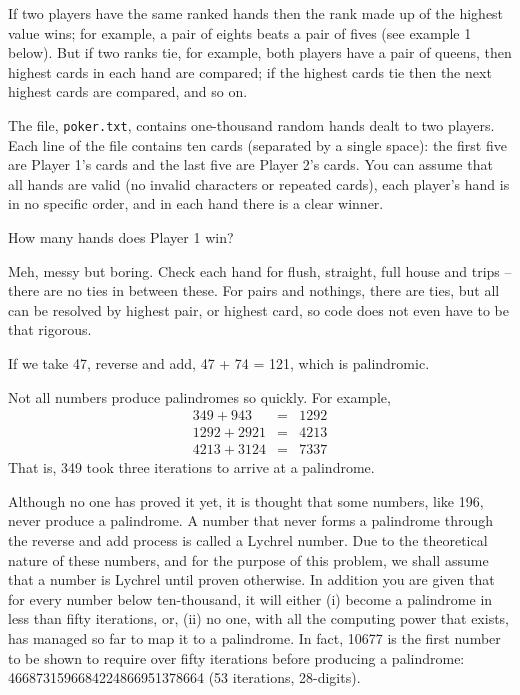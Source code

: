 If two players have the same ranked hands then the rank made up of the highest value wins; for example, a pair of eights beats a pair of fives (see example 1 below). But if two ranks tie, for example, both players have a pair of queens, then highest cards in each hand are compared; if the highest cards tie then the next highest cards are compared, and so on.

The file, \verb"poker.txt", contains one-thousand random hands dealt to two players. Each line of the file contains ten cards (separated by a single space): the first five are Player 1's cards and the last five are Player 2's cards. You can assume that all hands are valid (no invalid characters or repeated cards), each player's hand is in no specific order, and in each hand there is a clear winner.

How many hands does Player 1 win?

\vspace{-0.25cm}
Meh, messy but boring.  Check each hand for flush, straight, full house and trips -- there are no ties in between these.
For pairs and nothings, there are ties, but all can be resolved by highest pair, or highest card, so code does not even
have to be that rigorous.
\vspace{-0.25cm}




If we take 47, reverse and add, 47 + 74 = 121, which is palindromic.

Not all numbers produce palindromes so quickly. For example,
\begin{eqnarray*}
349 + 943 &= &1292 \\
1292 + 2921 &= &4213 \\
4213 + 3124 &= &7337
\end{eqnarray*}
That is, 349 took three iterations to arrive at a palindrome.

Although no one has proved it yet, it is thought that some numbers, like 196, never produce a palindrome. A number that never forms a palindrome through the reverse and add process is called a Lychrel number. Due to the theoretical nature of these numbers, and for the purpose of this problem, we shall assume that a number is Lychrel until proven otherwise. In addition you are given that for every number below ten-thousand, it will either (i) become a palindrome in less than fifty iterations, or, (ii) no one, with all the computing power that exists, has managed so far to map it to a palindrome. In fact, 10677 is the first number to be shown to require over fifty iterations before producing a palindrome: 4668731596684224866951378664 (53 iterations, 28-digits).

